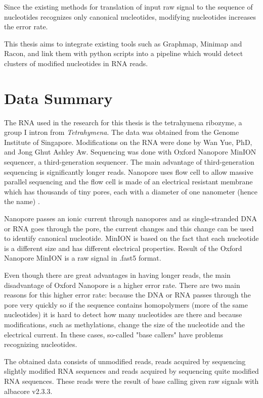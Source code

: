 \documentclass[times, utf8, zavrsni, numeric]{fer}
\begin{document}
Since the existing methods for translation of input raw signal to the sequence of 
nucleotides recognizes only canonical nucleotides, modifying nucleotides increases 
the error rate. 

This thesis aims to integrate existing tools such as Graphmap, Minimap and Racon, 
and link them with python scripts into a pipeline which would detect clusters of 
modified nucleotides in RNA reads. 



\chapter{Data Summary}
The RNA used in the research for this thesis is the tetrahymena ribozyme, 
a group I intron from \textit{Tetrahymena}. The data was obtained from the Genome Institute 
of Singapore. Modifications on the RNA were done by Wan Yue, PhD,  and Jong Ghut Ashley Aw.
Sequencing was done with Oxford Nanopore MinION sequencer, a third-generation sequencer.
The main advantage of third-generation sequencing is significantly longer reads. Nanopore
uses flow cell to allow massive parallel sequencing and the flow cell is made of an 
electrical resistant membrane which has thousands of tiny pores, each with a diameter of 
one nanometer (hence the name) \cite{oxfordNanopore}.

Nanopore passes an ionic current through nanopores and as single-stranded DNA or RNA goes
through the pore, the current changes and this change can be used to identify canonical nucleotide.
MinION is based on the fact that each nucleotide is a different size and has different electrical
properties. Result of the Oxford Nanopore MinION is a raw signal in .fast5 format.

Even though there are great advantages in having longer reads, the main disadvantage of Oxford Nanopore
is a higher error rate. There are two main reasons for this higher error rate: because the DNA or RNA passes 
through the pore very quickly so if the sequence contains homopolymers (more of the same nucleotides) it is hard
to detect how many nucleotides are there and because modifications, such as methylations, change the size of the nucleotide
and the electrical current. In these cases, so-called "base callers" have problems recognizing nucleotides.

The obtained data consists of unmodified reads, reads acquired by sequencing slightly 
modified RNA sequences and reads acquired by sequencing quite modified RNA sequences.
These reads were the result of base calling given raw signals with albacore v2.3.3.
\end{document}
